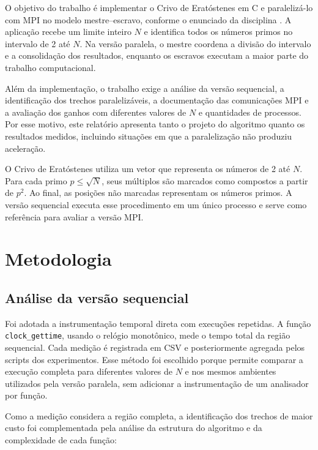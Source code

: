 \documentclass[12pt,a4paper]{article}
\begin{document}
O objetivo do trabalho é implementar o Crivo de Eratóstenes em C e
paralelizá-lo com MPI no modelo mestre--escravo, conforme o enunciado da
disciplina \cite{enunciado}. A aplicação recebe um limite inteiro $N$ e
identifica todos os números primos no intervalo de 2 até $N$. Na versão
paralela, o mestre coordena a divisão do intervalo e a consolidação dos
resultados, enquanto os escravos executam a maior parte do trabalho
computacional.

Além da implementação, o trabalho exige a análise da versão sequencial, a
identificação dos trechos paralelizáveis, a documentação das comunicações MPI
e a avaliação dos ganhos com diferentes valores de $N$ e quantidades de
processos. Por esse motivo, este relatório apresenta tanto o projeto do
algoritmo quanto os resultados medidos, incluindo situações em que a
paralelização não produziu aceleração.

O Crivo de Eratóstenes utiliza um vetor que representa os números de 2 até
$N$. Para cada primo $p\leq\sqrt{N}$, seus múltiplos são marcados como
compostos a partir de $p^2$. Ao final, as posições não marcadas representam os
números primos. A versão sequencial executa esse procedimento em um único
processo e serve como referência para avaliar a versão MPI.

\section{Metodologia}

\subsection{Análise da versão sequencial}

Foi adotada a instrumentação temporal direta com execuções repetidas. A função
\texttt{clock\_gettime}, usando o relógio monotônico, mede o tempo total da
região sequencial. Cada medição é registrada em CSV e posteriormente agregada
pelos scripts dos experimentos. Esse método foi escolhido porque permite
comparar a execução completa para diferentes valores de $N$ e nos mesmos
ambientes utilizados pela versão paralela, sem adicionar a instrumentação de
um analisador por função.

Como a medição considera a região completa, a identificação dos trechos de
maior custo foi complementada pela análise da estrutura do algoritmo e da
complexidade de cada função:
\end{document}
